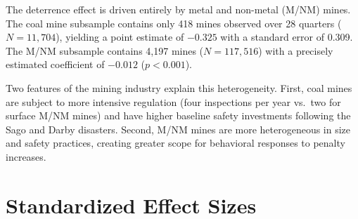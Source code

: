 \documentclass[12pt]{article}
\begin{document}
The deterrence effect is driven entirely by metal and non-metal (M/NM) mines. The coal mine subsample contains only 418 mines observed over 28 quarters ($N = 11{,}704$), yielding a point estimate of $-0.325$ with a standard error of 0.309. The M/NM subsample contains 4,197 mines ($N = 117{,}516$) with a precisely estimated coefficient of $-0.012$ ($p < 0.001$).

Two features of the mining industry explain this heterogeneity. First, coal mines are subject to more intensive regulation (four inspections per year vs.\ two for surface M/NM mines) and have higher baseline safety investments following the Sago and Darby disasters. Second, M/NM mines are more heterogeneous in size and safety practices, creating greater scope for behavioral responses to penalty increases.


\section{Standardized Effect Sizes}
\label{sec:sde}


\end{document}
